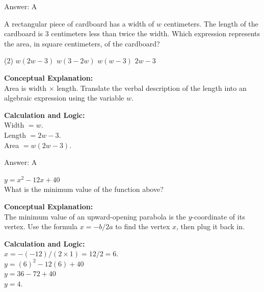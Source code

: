 \documentclass[11pt,paper=a4,answers]{exam}
\begin{document}
\begin{questions}
\begin{solution}
\vspace{25pt}

Answer: \colorbox{yellow!100}{A}
\end{solution}

\vspace{40pt}

\question
A rectangular piece of cardboard has a width of $w$ centimeters. The length of the cardboard is 3 centimeters less than twice the width. Which expression represents the area, in square centimeters, of the cardboard?
\begin{tasks}(2)
    \task $w(2w-3)$
    \task $w(3-2w)$
    \task $w(w-3)$
    \task $2w-3$
\end{tasks}

\begin{solution}
\textbf{Conceptual Explanation:} \\
Area is width $\times$ length. Translate the verbal description of the length into an algebraic expression using the variable $w$.

\vspace{20pt}

\textbf{Calculation and Logic:} \\
Width $= w$. \\
Length $= 2w - 3$. \\
Area $= w(2w - 3)$.

\vspace{25pt}

Answer: \colorbox{yellow!100}{A}
\end{solution}

\vspace{40pt}

\question
$y = x^2 - 12x + 40$ \\
What is the minimum value of the function above?

\begin{solution}
\textbf{Conceptual Explanation:} \\
The minimum value of an upward-opening parabola is the $y$-coordinate of its vertex. Use the formula $x = -b/2a$ to find the vertex $x$, then plug it back in.

\vspace{20pt}

\textbf{Calculation and Logic:} \\
$x = -(-12) / (2 \times 1) = 12 / 2 = 6$. \\
$y = (6)^2 - 12(6) + 40$ \\
$y = 36 - 72 + 40$ \\
$y = 4$.


\end{solution}
\end{questions}
\end{document}
